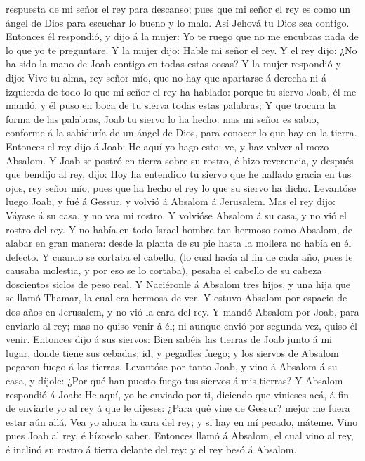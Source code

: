 respuesta de mi señor el rey para descanso; pues que mi señor el rey es
como un ángel de Dios para escuchar lo bueno y lo malo. Así Jehová tu
Dios sea contigo.  Entonces él respondió, y dijo á la
mujer: Yo te ruego que no me encubras nada de lo que yo te preguntare. Y
la mujer dijo: Hable mi señor el rey.  Y el rey dijo: ¿No
ha sido la mano de Joab contigo en todas estas cosas? Y la mujer
respondió y dijo: Vive tu alma, rey señor mío, que no hay que apartarse
á derecha ni á izquierda de todo lo que mi señor el rey ha hablado:
porque tu siervo Joab, él me mandó, y él puso en boca de tu sierva todas
estas palabras;  Y que trocara la forma de las palabras,
Joab tu siervo lo ha hecho: mas mi señor es sabio, conforme á la
sabiduría de un ángel de Dios, para conocer lo que hay en la tierra.
 Entonces el rey dijo á Joab: He aquí yo hago esto: ve, y
haz volver al mozo Absalom.  Y Joab se postró en tierra
sobre su rostro, é hizo reverencia, y después que bendijo al rey, dijo:
Hoy ha entendido tu siervo que he hallado gracia en tus ojos, rey señor
mío; pues que ha hecho el rey lo que su siervo ha dicho. 
Levantóse luego Joab, y fué á Gessur, y volvió á Absalom á Jerusalem.
 Mas el rey dijo: Váyase á su casa, y no vea mi rostro. Y
volvióse Absalom á su casa, y no vió el rostro del rey.  Y
no había en todo Israel hombre tan hermoso como Absalom, de alabar en
gran manera: desde la planta de su pie hasta la mollera no había en él
defecto.  Y cuando se cortaba el cabello, (lo cual hacía al
fin de cada año, pues le causaba molestia, y por eso se lo cortaba),
pesaba el cabello de su cabeza doscientos siclos de peso real.
 Y Naciéronle á Absalom tres hijos, y una hija que se llamó
Thamar, la cual era hermosa de ver.  Y estuvo Absalom por
espacio de dos años en Jerusalem, y no vió la cara del rey.
 Y mandó Absalom por Joab, para enviarlo al rey; mas no
quiso venir á él; ni aunque envió por segunda vez, quiso él venir.
 Entonces dijo á sus siervos: Bien sabéis las tierras de
Joab junto á mi lugar, donde tiene sus cebadas; id, y pegadles fuego; y
los siervos de Absalom pegaron fuego á las tierras. 
Levantóse por tanto Joab, y vino á Absalom á su casa, y díjole: ¿Por qué
han puesto fuego tus siervos á mis tierras?  Y Absalom
respondió á Joab: He aquí, yo he enviado por ti, diciendo que vinieses
acá, á fin de enviarte yo al rey á que le dijeses: ¿Para qué vine de
Gessur? mejor me fuera estar aún allá. Vea yo ahora la cara del rey; y
si hay en mí pecado, máteme.  Vino pues Joab al rey, é
hízoselo saber. Entonces llamó á Absalom, el cual vino al rey, é inclinó
su rostro á tierra delante del rey: y el rey besó á Absalom.

